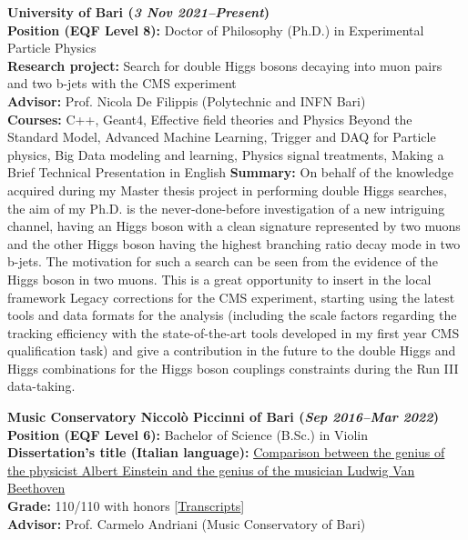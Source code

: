 \documentclass[11pt]{res}
\begin{document}
\begin{resume}
\textbf{University of Bari (\textit{3 Nov 2021--Present})}\\
\textbf{Position (EQF Level 8):} Doctor of Philosophy (Ph.D.) in Experimental Particle Physics\\
\textbf{Research project:}
Search for double Higgs bosons decaying into muon pairs and two b-jets with the CMS experiment\\
\textbf{Advisor:} Prof. Nicola De Filippis (Polytechnic and INFN Bari)\\
\textbf{Courses:} C++, Geant4, Effective field theories and Physics Beyond the Standard Model, Advanced Machine Learning, Trigger and DAQ for Particle physics, Big Data modeling and learning, Physics signal treatments, Making a Brief Technical Presentation in English
\textbf{Summary:} On behalf of the knowledge acquired during my Master thesis project in performing double Higgs searches, the aim of my Ph.D. is the never-done-before investigation of a new intriguing channel, having an Higgs boson with a clean signature represented by two muons and the other Higgs boson having the highest branching ratio decay mode in two b-jets. The motivation for such a search can be seen from the evidence of the Higgs boson in two muons. This is a great opportunity to insert in the local framework Legacy corrections for the CMS experiment, starting using the latest tools and data formats for the analysis (including the scale factors regarding the tracking efficiency with the state-of-the-art tools developed in my first year CMS qualification task) and give a contribution in the future to the double Higgs and Higgs combinations for the Higgs boson couplings constraints during the Run III data-taking.

\textbf{Music Conservatory Niccolò Piccinni of Bari (\textit{Sep 2016--Mar 2022})}\\
\textbf{Position (EQF Level 6):} Bachelor of Science (B.Sc.) in Violin\\
\textbf{Dissertation's title (Italian language):}
\href{https://drive.google.com/file/d/1D4PbAL-X92U5CsQO8JGemSHA03GEtdu0/view?usp=share_link}{Comparison between the genius of the physicist Albert Einstein and the genius of the musician Ludwig Van Beethoven}\\
\textbf{Grade:} 110/110 with honors [\href{https://drive.google.com/file/d/1aV1ERPqgSpQ-9SRbWIpw-Q4BkuS1kvyy/view?usp=share_link}{Transcripts}]\\
\textbf{Advisor:} Prof. Carmelo Andriani (Music Conservatory of Bari)


\end{resume}
\end{document}
